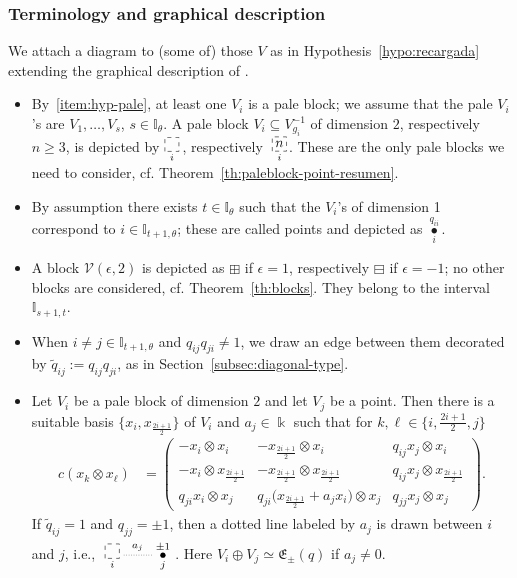 \documentclass[10pt,a4paper]{amsart}
\numberwithin{equation}{section}
\newcommand{\Vc}{{\mathcal{V}}}
\newcommand{\I}{{\mathbb I}}
\newcommand{\eny}{\mathfrak{E}}
\newcommand{\idos}{\frac{2i+1}{2}}
\begin{document}
\subsubsection{Terminology and graphical description}\label{subsubsec:terminology}
We attach a diagram to (some of) those $V$ as in Hypothesis~\ref{hypo:recargada}
extending the graphical description of \cite{AAH-triang}.
\begin{itemize}\itemsep=0pt
\item By~\ref{item:hyp-pale}, at least one $V_i$ is a pale block; we assume that the pale $V_i$'s are
$V_1, \dots, V_{s}$, $s \in \I_{\theta}$.
A pale block $V_i \subseteq V_{g_i}^{-1}$ of dimension $2$, respectively $n\geq 3$, is depicted by
$\underset{i}{\begin{tikzpicture}
\draw[dashed] (0,0) rectangle (0.36,0.36);
\end{tikzpicture}}$\,, respectively~$\underset{i}{\begin{tikzpicture}
\draw[dashed] (0,0) rectangle node[pos=.5] {$n$} (0.36,0.36);
\end{tikzpicture}}$.
These are the only pale blocks we need to consider, cf. Theorem~\ref{th:paleblock-point-resumen}.
\item
By assumption there exists $t \in \I_{\theta}$ such that the $V_i$'s of dimension 1 correspond to $i\in\I_{t+1, \theta}$;
these are called points and depicted as $\overset{q_{ii}} {\underset{i}{\bullet}}$.
\item
A block $\Vc(\epsilon,2)$ is depicted as $\boxplus$ if $\epsilon= 1$, respectively $\boxminus$ if $\epsilon = -1$;
no other blocks are considered, cf. Theorem~\ref{th:blocks}. They belong to the interval $\I_{s+1,t}$.
\item
When $ i\neq j \in \I_{t+1, \theta}$ and $q_{ij}q_{ji} \neq 1$, we draw an edge between
them decorated by $\widetilde{q}_{ij} := q_{ij}q_{ji}$, as in Section~\ref{subsec:diagonal-type}.
\item
Let $V_i$ be a pale block of dimension $2$ and let $V_j$ be a point. Then there
is a suitable basis $\big\{x_i, x_{\idos}\big\}$ of $V_i$ and $a_j\in \Bbbk$ such that
for $k,\ell\in \big\{i,\idos, j \big\}$
\begin{align*}
c(x_k\otimes x_{\ell}) &=
\begin{pmatrix}
- x_i \otimes x_i& - x_{\idos} \otimes x_i& q_{ij} x_j \otimes x_i
\\
- x_i \otimes x_{\idos} & - x_{\idos} \otimes x_{\idos} & q_{ij} x_j \otimes x_{\idos}
\\
q_{ji} x_i \otimes x_j & q_{ji}\big(x_{\idos} + a_jx_i\big) \otimes x_j & q_{jj} x_j \otimes x_j
\end{pmatrix}\!.
\end{align*}
If $\widetilde{q}_{ij}=1$ and $q_{jj} = \pm 1$, then
a dotted line labeled by $a_j$ is drawn between $i$ and $j$, i.e.,
$\xymatrix@C=20pt{ \underset{i}{\begin{tikzpicture}
\draw[dashed] (0,0) rectangle (0.36,0.36);
\end{tikzpicture}} \ar @{.}^{a_j}[r] & \overset{\pm1}{\underset{j}{\bullet}}}$\!.
Here $V_i \oplus V_j \simeq \eny_{\pm}(q)$ if $a_j \neq 0$.


\end{itemize}
\end{document}
